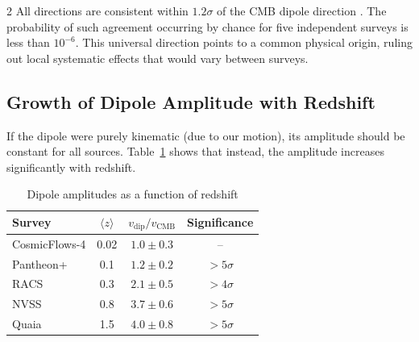 \documentclass[12pt,a4paper]{article}
\begin{document}
	\begin{multicols}{2}
		All directions are consistent within \(1.2\sigma\) of the CMB dipole direction \cite{Oayda2024}. The probability of such agreement occurring by chance for five independent surveys is less than \(10^{-6}\). This universal direction points to a common physical origin, ruling out local systematic effects that would vary between surveys.
		
		\subsection{Growth of Dipole Amplitude with Redshift}
		
		If the dipole were purely kinematic (due to our motion), its amplitude should be constant for all sources. Table~\ref{tab:dipole_amplitudes} shows that instead, the amplitude increases significantly with redshift.
		
	\end{multicols}
	
	\begin{table}[htbp]
		\centering
		\caption{Dipole amplitudes as a function of redshift}
		\label{tab:dipole_amplitudes}
		\begin{tabular}{lccc}
			\toprule
			\textbf{Survey} & \(\langle z \rangle\) & \(v_{\text{dip}}/v_{\text{CMB}}\) & \textbf{Significance} \\
			\midrule
			CosmicFlows-4 & 0.02 & \(1.0 \pm 0.3\) & -- \\
			Pantheon+ & 0.1 & \(1.2 \pm 0.2\) & \(>5\sigma\) \cite{Sah2025} \\
			RACS & 0.3 & \(2.1 \pm 0.5\) & \(>4\sigma\) \cite{Oayda2024} \\
			NVSS & 0.8 & \(3.7 \pm 0.6\) & \(>5\sigma\) \cite{Singal2024} \\
			Quaia & 1.5 & \(4.0 \pm 0.8\) & \(>5\sigma\) \cite{Secrest2025} \\
			\bottomrule
		\end{tabular}
	\end{table}
	
\end{document}
